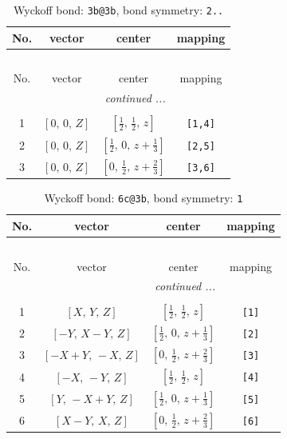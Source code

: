 \documentclass[fleqn,8pt]{jsarticle}
\begin{document}
\renewcommand{\arraystretch}{1.2}
\begin{longtable}{cccc}
\caption{Wyckoff bond: {\tt 3b@3b}, bond symmetry: {\tt 2..}}
 \\
 \hline \hline
No. & vector & center & mapping \\ \hline \endfirsthead

\multicolumn{3}{l}{\tablename\ \thetable{}} \\
 \hline \hline
No. & vector & center & mapping \\ \hline \endhead

 \hline \hline
\multicolumn{3}{r}{\footnotesize\it continued ...} \\ \endfoot

 \hline \hline
\multicolumn{3}{r}{} \\ \endlastfoot

1 & $\left[ 0,\, 0,\, Z \right]$ & $\left[ \frac{1}{2},\, \frac{1}{2},\, z \right]$ & {\tt [1,4]} \\ \hline
2 & $\left[ 0,\, 0,\, Z \right]$ & $\left[ \frac{1}{2},\, 0,\, z + \frac{1}{3} \right]$ & {\tt [2,5]} \\ \hline
3 & $\left[ 0,\, 0,\, Z \right]$ & $\left[ 0,\, \frac{1}{2},\, z + \frac{2}{3} \right]$ & {\tt [3,6]} \\
\end{longtable}
\renewcommand{\arraystretch}{1.2}
\begin{longtable}{cccc}
\caption{Wyckoff bond: {\tt 6c@3b}, bond symmetry: {\tt 1}}
 \\
 \hline \hline
No. & vector & center & mapping \\ \hline \endfirsthead

\multicolumn{3}{l}{\tablename\ \thetable{}} \\
 \hline \hline
No. & vector & center & mapping \\ \hline \endhead

 \hline \hline
\multicolumn{3}{r}{\footnotesize\it continued ...} \\ \endfoot

 \hline \hline
\multicolumn{3}{r}{} \\ \endlastfoot

1 & $\left[ X,\, Y,\, Z \right]$ & $\left[ \frac{1}{2},\, \frac{1}{2},\, z \right]$ & {\tt [1]} \\ \hline
2 & $\left[ - Y,\, X - Y,\, Z \right]$ & $\left[ \frac{1}{2},\, 0,\, z + \frac{1}{3} \right]$ & {\tt [2]} \\ \hline
3 & $\left[ - X + Y,\, - X,\, Z \right]$ & $\left[ 0,\, \frac{1}{2},\, z + \frac{2}{3} \right]$ & {\tt [3]} \\ \hline
4 & $\left[ - X,\, - Y,\, Z \right]$ & $\left[ \frac{1}{2},\, \frac{1}{2},\, z \right]$ & {\tt [4]} \\ \hline
5 & $\left[ Y,\, - X + Y,\, Z \right]$ & $\left[ \frac{1}{2},\, 0,\, z + \frac{1}{3} \right]$ & {\tt [5]} \\ \hline
6 & $\left[ X - Y,\, X,\, Z \right]$ & $\left[ 0,\, \frac{1}{2},\, z + \frac{2}{3} \right]$ & {\tt [6]} \\
\end{longtable}
\end{document}
